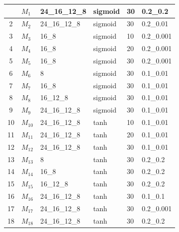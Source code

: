 \begin{minipage}{\textwidth}
\begin{longtable}{|c|l|l|l|l|l|}
                     \endfoot
                     \hline
                     \endlastfoot
                     1 & $M_{1}$ & 24\_16\_12\_8 & sigmoid & 30 & 0.2\_0.2 \\ \hline
                     2 & $M_{2}$ & 24\_16\_12\_8 & sigmoid & 30 & 0.2\_0.01 \\ \hline
                     3 & $M_{3}$ & 16\_8 & sigmoid & 10 & 0.2\_0.001 \\ \hline
                     4 & $M_{4}$ & 16\_8 & sigmoid & 20 & 0.2\_0.001 \\ \hline
                     5 & $M_{5}$ & 16\_8 & sigmoid & 30 & 0.2\_0.001 \\ \hline
                     6 & $M_{6}$ & 8 & sigmoid & 30 & 0.1\_0.01 \\ \hline
                     7 & $M_{7}$ & 16\_8 & sigmoid & 30 & 0.1\_0.01 \\ \hline
                     8 & $M_{8}$ & 16\_12\_8 & sigmoid & 30 & 0.1\_0.01 \\ \hline
                     9 & $M_{9}$ & 24\_16\_12\_8 & sigmoid & 30 & 0.1\_0.01 \\ \hline

                     10 & $M_{10}$ & 24\_16\_12\_8 & tanh & 10 & 0.1\_0.01 \\ \hline
                     11 & $M_{11}$ & 24\_16\_12\_8 & tanh & 20 & 0.1\_0.01 \\ \hline
                     12 & $M_{12}$ & 24\_16\_12\_8 & tanh & 30 & 0.1\_0.01 \\ \hline

                     13 & $M_{13}$ & 8 & tanh & 30 & 0.2\_0.2 \\ \hline
                     14 & $M_{14}$ & 16\_8 & tanh & 30 & 0.2\_0.2 \\ \hline
                     15 & $M_{15}$ & 16\_12\_8 & tanh & 30 & 0.2\_0.2 \\ \hline

                     16 & $M_{16}$ & 24\_16\_12\_8 & tanh & 30 & 0.1\_0.1 \\ \hline
                     17 & $M_{17}$ & 24\_16\_12\_8 & tanh & 30 & 0.2\_0.001 \\ \hline
                     18 & $M_{18}$ & 24\_16\_12\_8 & tanh & 30 & 0.2\_0.2 \\ \hline
                 \end{longtable}
    \end{minipage}

    \vspace{2em}

